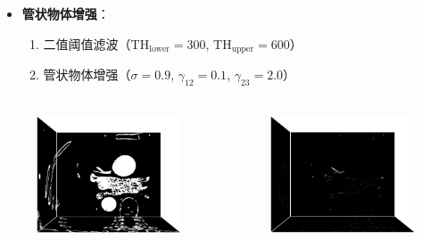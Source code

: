 \begin{frame}
\begin{itemize}
  \item \textbf{管状物体增强}：
  \begin{enumerate}
     \item 二值阈值滤波（$\text{TH}_{\text{lower}} = 300$, $\text{TH}_{\text{upper}} = 600$）
     \item 管状物体增强（$\sigma = 0.9$, $\gamma_{12} = 0.1$, $\gamma_{23} = 2.0$）
  \end{enumerate}
\end{itemize}
\begin{columns}[b,onlytextwidth]
\begin{column}{.5\textwidth}
 \begin{figure}[t]
\centering
\includegraphics[height=1.5in]{../../Figures/coronary/coronary_enhanced/binary1.eps}
\end{figure}
\end{column}
\begin{column}{.5\textwidth}
 \begin{figure}[t]
\centering
\includegraphics[height=1.5in]{../../Figures/coronary/coronary_enhanced/hessian.eps}
\end{figure}
\end{column}
\end{columns}
\end{frame}

